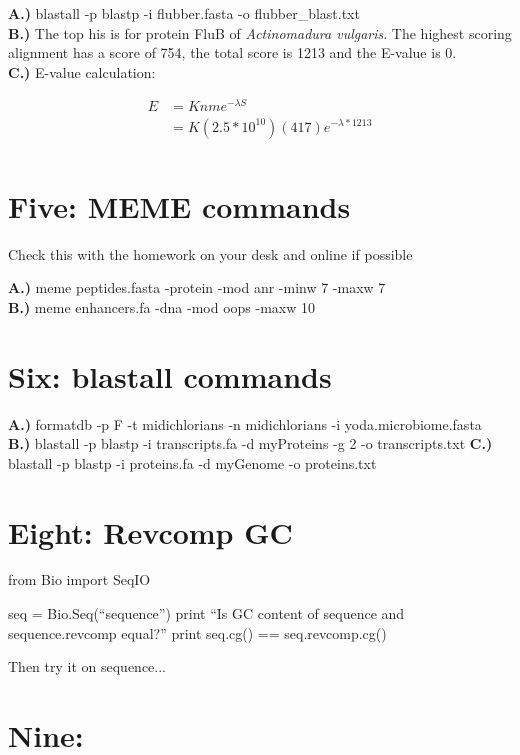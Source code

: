 \documentclass[10pt]{article} %
\begin{document}
\textbf{A.)} blastall -p blastp -i flubber.fasta -o flubber\_blast.txt\\
\textbf{B.)} The top his is for protein FluB of \textit{Actinomadura vulgaris}.
The highest scoring alignment has a score of 754, the total score is 1213 and the
E-value is 0.\\
\textbf{C.)} E-value calculation:

\begin{align*}
  E &= Knme^{-\lambda S}\\
  &= K(2.5*10^{10})(417)e^{-\lambda * 1213}\\
\end{align*}

\section{Five: MEME commands}

Check this with the homework on your desk and online if possible

\textbf{A.)} meme peptides.fasta -protein -mod anr -minw 7 -maxw 7\\
\textbf{B.)} meme enhancers.fa -dna -mod oops -maxw 10\\

\section{Six: blastall commands}
\textbf{A.)} formatdb -p F -t midichlorians -n midichlorians -i yoda.microbiome.fasta\\
\textbf{B.)} blastall -p blastp -i transcripts.fa -d myProteins  -g 2 -o transcripts.txt
\textbf{C.)} blastall -p blastp -i proteins.fa -d myGenome -o proteins.txt\\

\section{Eight: Revcomp GC}

from Bio import SeqIO

seq = Bio.Seq(``sequence'')
print ``Is GC content of sequence and sequence.revcomp equal?''
print seq.cg() == seq.revcomp.cg()

Then try it on sequence...

\section{Nine: }
\end{document}
